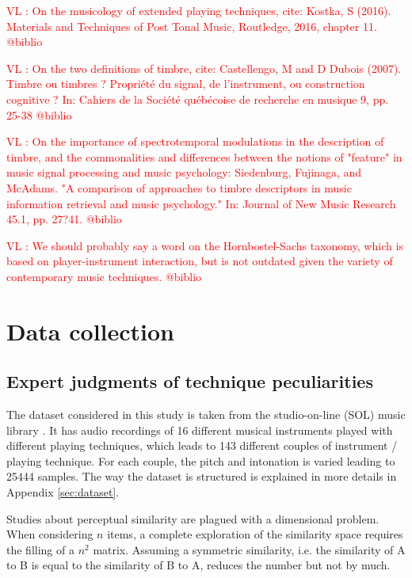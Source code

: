 \documentclass{article}
\makeatletter
\newcommand*{\ie}{i.e.\@\xspace}
\newcommand{\vl}[1]{\textcolor{red}{VL : #1}}
\makeatother
\begin{document}
\vl{On the musicology of extended playing techniques, cite:
Kostka, S (2016). Materials and Techniques of Post Tonal Music, Routledge, 2016, chapter 11. @biblio}

\vl{On the two definitions of timbre, cite:
Castellengo, M and D Dubois (2007). Timbre ou timbres ? Propri\'{e}t\'{e}
du signal, de l'instrument, ou construction cognitive ? In: Cahiers
de la Soci\'{e}t\'{e} qu\'{e}b\'{e}coise de recherche en musique 9, pp. 25-38
 @biblio}
 
\vl{On the importance of spectrotemporal modulations in the description
of timbre, and the commonalities and differences between the notions of
"feature" in music signal processing and music psychology:
Siedenburg, Fujinaga, and McAdams. "A comparison of
approaches to timbre descriptors in music information retrieval
and music psychology." In: Journal of New Music Research 45.1,
pp. 27?41. @biblio}

\vl{We should probably say a word on the Hornbostel-Sachs taxonomy,
which is based on player-instrument interaction, but is not outdated
given the variety of contemporary music techniques. @biblio}



\section{Data collection}\label{sec:xp1}


\subsection{Expert judgments of technique peculiarities}

The dataset considered in this study is taken
from the studio-on-line (SOL) music library  \cite{peeters2000instrument}.
It has audio recordings of 16 different musical instruments played
with different playing techniques,
which leads to 143 different couples of instrument / playing technique.
For each couple, the pitch and intonation is varied leading to 25444 samples. 
The way the dataset is structured
is explained in more details in Appendix \ref{sec:dataset}.

Studies about perceptual similarity are plagued with a dimensional problem.
When considering $n$ items, a complete exploration of the similarity space
requires the filling of a $n^2$ matrix. Assuming a symmetric similarity,
\ie{} the similarity of A to B is equal to the similarity of B to A,
reduces the number but not by much.
\end{document}
